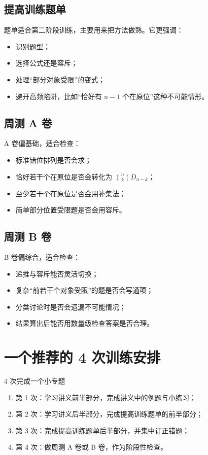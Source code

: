 \documentclass[11pt,a4paper,fontset=fandol]{ctexart}
\begin{document}
\subsection{提高训练题单}
题单适合第二阶段训练，主要用来把方法做熟。它更强调：
\begin{itemize}
  \item 识别题型；
  \item 选择公式还是容斥；
  \item 处理“部分对象受限”的变式；
  \item 避开高频陷阱，比如“恰好有 $n-1$ 个在原位”这种不可能情形。
\end{itemize}

\subsection{周测 A 卷}
A 卷偏基础，适合检查：
\begin{itemize}
  \item 标准错位排列是否会求；
  \item 恰好若干个在原位是否会转化为 $\binom{n}{k}D_{n-k}$；
  \item 至少若干个在原位是否会用补集法；
  \item 简单部分位置受限题是否会用容斥。
\end{itemize}

\subsection{周测 B 卷}
B 卷偏综合，适合检查：
\begin{itemize}
  \item 递推与容斥能否灵活切换；
  \item 复杂“前若干个对象受限”的题是否会写通项；
  \item 分类讨论时是否会遗漏不可能情况；
  \item 结果算出后能否用数量级检查答案是否合理。
\end{itemize}

\section{一个推荐的 4 次训练安排}

\begin{goalbox}{4 次完成一个小专题}
\begin{enumerate}
  \item 第 1 次：学习讲义前半部分，完成讲义中的例题与小练习；
  \item 第 2 次：学习讲义后半部分，完成提高训练题单的前半部分；
  \item 第 3 次：完成提高训练题单后半部分，并集中订正错题；
  \item 第 4 次：做周测 A 卷或 B 卷，作为阶段性检查。
\end{enumerate}
\end{goalbox}
\end{document}
